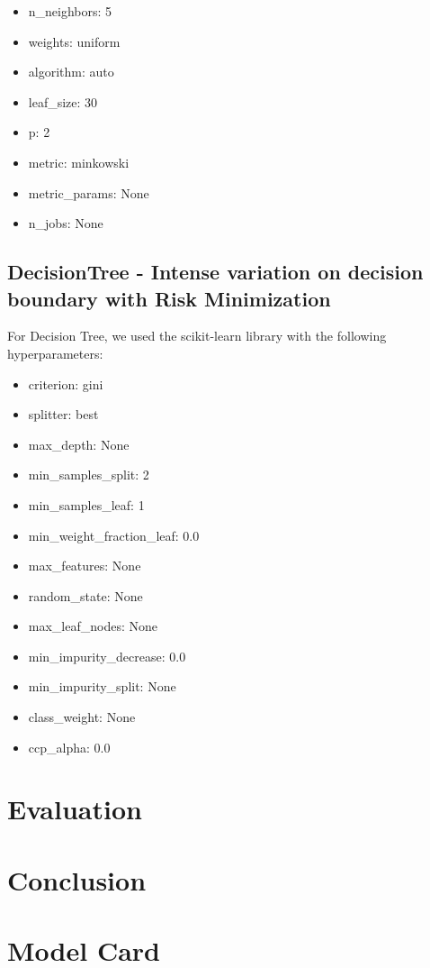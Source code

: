 \documentclass[conference]{IEEEtran}
\begin{document}
\begin{itemize}
    \item n\_neighbors: 5
    \item weights: uniform
    \item algorithm: auto
    \item leaf\_size: 30
    \item p: 2
    \item metric: minkowski
    \item metric\_params: None
    \item n\_jobs: None
\end{itemize}


\subsection{DecisionTree - Intense variation on decision boundary with Risk Minimization}
For Decision Tree, we used the scikit-learn library with the following hyperparameters:

\begin{itemize}
    \item criterion: gini
    \item splitter: best
    \item max\_depth: None
    \item min\_samples\_split: 2
    \item min\_samples\_leaf: 1
    \item min\_weight\_fraction\_leaf: 0.0
    \item max\_features: None
    \item random\_state: None
    \item max\_leaf\_nodes: None
    \item min\_impurity\_decrease: 0.0
    \item min\_impurity\_split: None
    \item class\_weight: None
    \item ccp\_alpha: 0.0
\end{itemize}

\section{Evaluation}
\section{Conclusion}

\section{Model Card}
\end{document}
